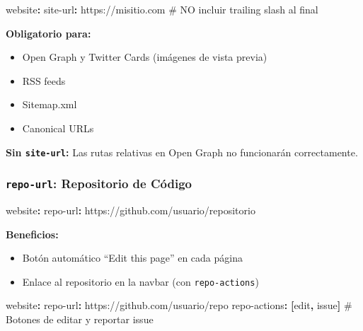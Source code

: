 \documentclass[
  doc,
  floatsintext,
  longtable,
  a4paper,
  nolmodern,
  notxfonts,
  notimes,
  12pt,
  colorlinks=true,linkcolor=blue,citecolor=blue,urlcolor=blue]{apa7}
\newenvironment{Shaded}{\begin{snugshade}}{\end{snugshade}}
\newcommand{\AttributeTok}[1]{\textcolor[rgb]{0.40,0.45,0.13}{#1}}
\newcommand{\CommentTok}[1]{\textcolor[rgb]{0.37,0.37,0.37}{#1}}
\newcommand{\FunctionTok}[1]{\textcolor[rgb]{0.28,0.35,0.67}{#1}}
\newcommand{\KeywordTok}[1]{\textcolor[rgb]{0.00,0.23,0.31}{\textbf{#1}}}
\providecommand{\tightlist}{%
  \setlength{\itemsep}{0pt}\setlength{\parskip}{0pt}}
\begin{document}
\begin{Shaded}
\begin{Highlighting}[]
\FunctionTok{website}\KeywordTok{:}
\AttributeTok{  }\FunctionTok{site{-}url}\KeywordTok{:}\AttributeTok{ https://misitio.com}
\CommentTok{  \# NO incluir trailing slash al final}
\end{Highlighting}
\end{Shaded}

\textbf{Obligatorio para:}

\begin{itemize}
\tightlist
\item
  Open Graph y Twitter Cards (imágenes de vista previa)
\item
  RSS feeds
\item
  Sitemap.xml
\item
  Canonical URLs
\end{itemize}

\textbf{Sin \texttt{site-url}:} Las rutas relativas en Open Graph no
funcionarán correctamente.

\subsubsection{\texorpdfstring{\texttt{repo-url}: Repositorio de
Código}{repo-url: Repositorio de Código}}\label{repo-url-repositorio-de-cuxf3digo}

\begin{Shaded}
\begin{Highlighting}[]
\FunctionTok{website}\KeywordTok{:}
\AttributeTok{  }\FunctionTok{repo{-}url}\KeywordTok{:}\AttributeTok{ https://github.com/usuario/repositorio}
\end{Highlighting}
\end{Shaded}

\textbf{Beneficios:}

\begin{itemize}
\tightlist
\item
  Botón automático ``Edit this page'' en cada página
\item
  Enlace al repositorio en la navbar (con \texttt{repo-actions})
\end{itemize}

\begin{Shaded}
\begin{Highlighting}[]
\FunctionTok{website}\KeywordTok{:}
\AttributeTok{  }\FunctionTok{repo{-}url}\KeywordTok{:}\AttributeTok{ https://github.com/usuario/repo}
\AttributeTok{  }\FunctionTok{repo{-}actions}\KeywordTok{:}\AttributeTok{ }\KeywordTok{[}\AttributeTok{edit}\KeywordTok{,}\AttributeTok{ issue}\KeywordTok{]}\CommentTok{    \# Botones de editar y reportar issue}
\end{Highlighting}
\end{Shaded}
\end{document}
